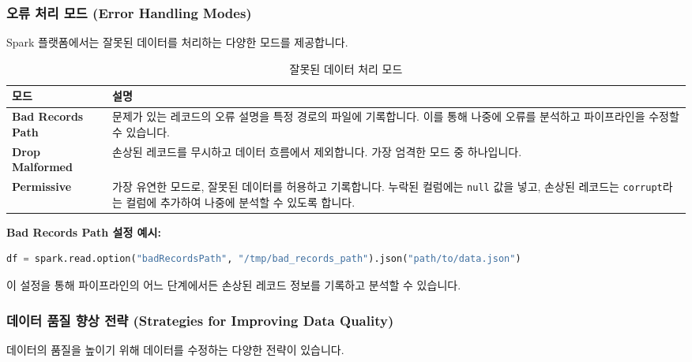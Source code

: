 \documentclass[11pt,a4paper]{article}
\begin{document}
\begin{enumerate}
\subsubsection{오류 처리 모드 (Error Handling Modes)}
Spark 플랫폼에서는 잘못된 데이터를 처리하는 다양한 모드를 제공합니다.

\begin{table}[h!]
\centering
\caption{잘못된 데이터 처리 모드}
\label{tab:error_handling_modes}
\begin{adjustbox}{width=\textwidth}
\begin{tabular}{p{}p{}}
\toprule
\textbf{모드} & \textbf{설명} \\
\midrule
\textbf{Bad Records Path} & 문제가 있는 레코드의 오류 설명을 특정 경로의 파일에 기록합니다. 이를 통해 나중에 오류를 분석하고 파이프라인을 수정할 수 있습니다. \\
\textbf{Drop Malformed} & 손상된 레코드를 무시하고 데이터 흐름에서 제외합니다. 가장 엄격한 모드 중 하나입니다. \\
\textbf{Permissive} & 가장 유연한 모드로, 잘못된 데이터를 허용하고 기록합니다. 누락된 컬럼에는 \texttt{null} 값을 넣고, 손상된 레코드는 \texttt{corrupt}라는 컬럼에 추가하여 나중에 분석할 수 있도록 합니다. \\
\bottomrule
\end{tabular}
\end{adjustbox}
\end{table}

\begin{examplebox}
\textbf{Bad Records Path 설정 예시:}
\begin{lstlisting}[language=python, caption={Bad Records Path 설정 예시}, label={lst:bad_records_path}]
df = spark.read.option("badRecordsPath", "/tmp/bad_records_path").json("path/to/data.json")
\end{lstlisting}
이 설정을 통해 파이프라인의 어느 단계에서든 손상된 레코드 정보를 기록하고 분석할 수 있습니다.
\end{examplebox}

\subsubsection{데이터 품질 향상 전략 (Strategies for Improving Data Quality)}
데이터의 품질을 높이기 위해 데이터를 수정하는 다양한 전략이 있습니다.


\end{enumerate}
\end{document}
